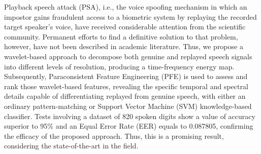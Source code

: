 \par Playback speech attack (PSA), i.e., the voice spoofing mechanism in which an impostor gains fraudulent access to a biometric system by replaying the recorded target speaker's voice, have received considerable attention from the scientific community. Permanent efforts to find a definitive solution to that problem, however, have not been described in academic literature. Thus, we propose a wavelet-based approach to decompose both genuine and replayed speech signals into different levels of resolution, producing a time-frequency energy map. Subsequently, Paraconsistent Feature Engineering (PFE) is used to assess and rank those wavelet-based features, revealing the specific temporal and spectral details capable of differentiating replayed from genuine speech, with either an ordinary pattern-matching or Support Vector Machine (SVM) knowledge-based classifier. Tests involving a dataset of 820 spoken digits show a value of accuracy superior to 95\% and an Equal Error Rate (EER) equals to 0.087805, confirming the efficacy of the proposed approach. Thus, this is a promising result, considering the state-of-the-art in the field.